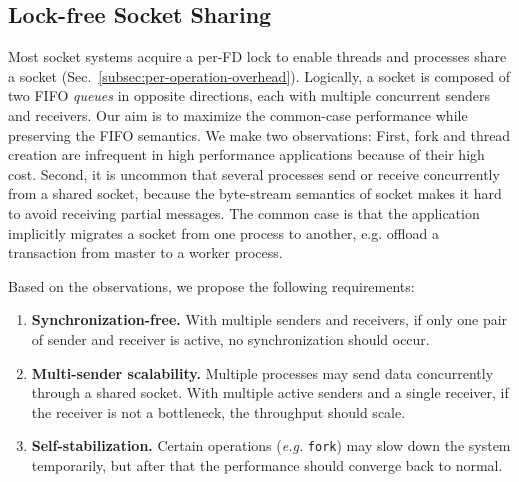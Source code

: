 \subsection{Lock-free Socket Sharing}
\label{subsec:fork}

Most socket systems acquire a per-FD lock to enable threads and processes share a socket (Sec.~\ref{subsec:per-operation-overhead}).
Logically, a socket is composed of two FIFO \emph{queues} in opposite directions, each with multiple concurrent senders and receivers.
Our aim is to maximize the common-case performance while preserving the FIFO semantics.
We make two observations: First, fork and thread creation are infrequent in high performance applications because of their high cost.
Second, it is uncommon that several processes send or receive concurrently from a shared socket, because the byte-stream semantics of socket makes it hard to avoid receiving partial messages.
The common case is that the application implicitly migrates a socket from one process to another, e.g. offload a transaction from master to a worker process.

\iffalse
Based on the observations, we propose the following requirements:

\begin{enumerate}
 \item \textbf{Synchronization-free.} With multiple senders and receivers, if only one pair of sender and receiver is active, no synchronization should occur.
 \item \textbf{Multi-sender scalability.} Multiple processes may send data concurrently through a shared socket. With multiple active senders and a single receiver, if the receiver is not a bottleneck, the throughput should scale.
 \item \textbf{Self-stabilization.} Certain operations (\textit{e.g.} \texttt{fork}) may slow down the system temporarily, but after that the performance should converge back to normal.
\end{enumerate}

